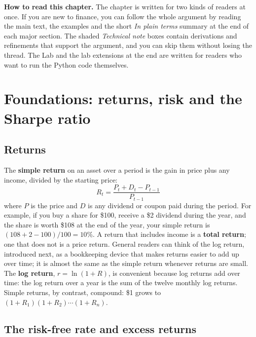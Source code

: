 \begin{callout}
\textbf{How to read this chapter.} The chapter is written for two kinds of readers at once. If you are new to finance, you can follow the whole argument by reading the main text, the examples and the short \emph{In plain terms} summary at the end of each major section. The shaded \emph{Technical note} boxes contain derivations and refinements that support the argument, and you can skip them without losing the thread. The Lab and the lab extensions at the end are written for readers who want to run the Python code themselves.
\end{callout}

\section{Foundations: returns, risk and the Sharpe ratio}
\label{sec:01-foundations}

\subsection{Returns}

The \textbf{simple return} on an asset over a period is the gain in price plus any income, divided by the starting price:
\begin{equation}
  R_t = \frac{P_t + D_t - P_{t-1}}{P_{t-1}}
  \label{eq:01-return}
\end{equation}
where $P$ is the price and $D$ is any dividend or coupon paid during the period. For example, if you buy a share for \$100, receive a \$2 dividend during the year, and the share is worth \$108 at the end of the year, your simple return is $(108 + 2 - 100)/100 = 10$\%. A return that includes income is a \textbf{total return}; one that does not is a price return. General readers can think of the log return, introduced next, as a bookkeeping device that makes returns easier to add up over time; it is almost the same as the simple return whenever returns are small. The \textbf{log return}, $r = \ln(1 + R)$, is convenient because log returns add over time: the log return over a year is the sum of the twelve monthly log returns. Simple returns, by contrast, compound: \$1 grows to $(1 + R_1)(1 + R_2)\cdots(1 + R_n)$.

\subsection{The risk-free rate and excess returns}
\label{sec:01-rf}

